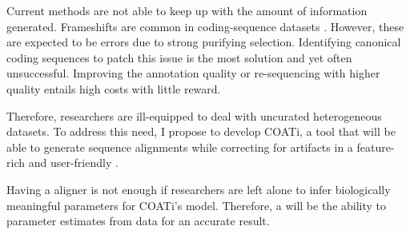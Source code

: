 
Current methods are not able to keep up with the amount of information
generated.
Frameshifts are common in coding-sequence datasets .
However, these are expected to be errors due to strong purifying selection.
Identifying canonical coding sequences to patch this issue is the most
 solution and yet often unsuccessful.
Improving the annotation quality or re-sequencing with higher quality entails
high costs with little reward.

Therefore, researchers are ill-equipped to deal with uncurated heterogeneous
datasets.
To address this need, I propose to develop COATi, a tool that will be able to
generate sequence alignments while correcting for artifacts in a feature-rich
and user-friendly .

Having a  aligner is not enough if
researchers are left alone to infer biologically meaningful parameters for
COATi's model.
Therefore, a  will be the ability to  parameter
estimates from data for an accurate result.
